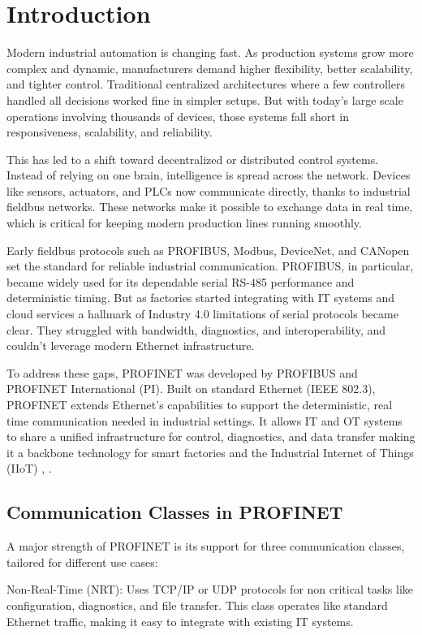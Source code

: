 \documentclass[conference]{IEEEtran}
\begin{document}
\section{Introduction}
Modern industrial automation is changing fast. As production systems grow more complex and dynamic, manufacturers demand higher flexibility, better scalability, and tighter control. Traditional centralized architectures where a few controllers handled all decisions worked fine in simpler setups. But with today’s large scale operations involving thousands of devices, those systems fall short in responsiveness, scalability, and reliability.

This has led to a shift toward decentralized or distributed control systems. Instead of relying on one brain, intelligence is spread across the network. Devices like sensors, actuators, and PLCs now communicate directly, thanks to industrial fieldbus networks. These networks make it possible to exchange data in real time, which is critical for keeping modern production lines running smoothly.

Early fieldbus protocols such as PROFIBUS, Modbus, DeviceNet, and CANopen set the standard for reliable industrial communication. PROFIBUS, in particular, became widely used for its dependable serial RS-485 performance and deterministic timing. But as factories started integrating with IT systems and cloud services a hallmark of Industry 4.0 limitations of serial protocols became clear. They struggled with bandwidth, diagnostics, and interoperability, and couldn’t leverage modern Ethernet infrastructure.

To address these gaps, PROFINET was developed by PROFIBUS and PROFINET International (PI). Built on standard Ethernet (IEEE 802.3), PROFINET extends Ethernet’s capabilities to support the deterministic, real time communication needed in industrial settings. It allows IT and OT systems to share a unified infrastructure for control, diagnostics, and data transfer making it a backbone technology for smart factories and the Industrial Internet of Things (IIoT) \cite{galloway2012industrial}, \cite{neumann2007communication}.

\subsection{Communication Classes in PROFINET} 
A major strength of PROFINET is its support for three communication classes, tailored for different use cases:

Non-Real-Time (NRT): Uses TCP/IP or UDP protocols for non critical tasks like configuration, diagnostics, and file transfer. This class operates like standard Ethernet traffic, making it easy to integrate with existing IT systems.
\end{document}
